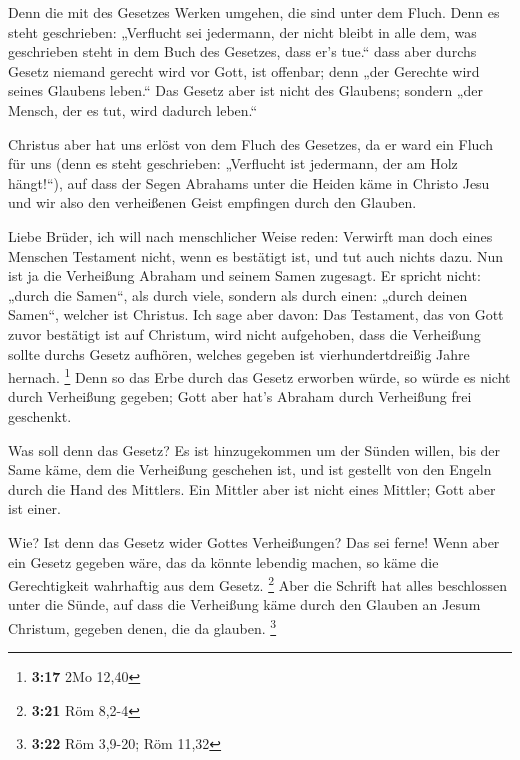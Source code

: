  Denn die mit des Gesetzes Werken umgehen, die sind unter
dem Fluch. Denn es steht geschrieben: „Verflucht sei jedermann, der
nicht bleibt in alle dem, was geschrieben steht in dem Buch des
Gesetzes, dass er's tue.``  dass aber durchs Gesetz
niemand gerecht wird vor Gott, ist offenbar; denn „der Gerechte wird
seines Glaubens leben.``  Das Gesetz aber ist nicht des
Glaubens; sondern „der Mensch, der es tut, wird dadurch leben.``

 Christus aber hat uns erlöst von dem Fluch des Gesetzes,
da er ward ein Fluch für uns (denn es steht geschrieben: „Verflucht ist
jedermann, der am Holz hängt!{}``),  auf dass der Segen
Abrahams unter die Heiden käme in Christo Jesu und wir also den
verheißenen Geist empfingen durch den Glauben.

 Liebe Brüder, ich will nach menschlicher Weise reden:
Verwirft man doch eines Menschen Testament nicht, wenn es bestätigt ist,
und tut auch nichts dazu.  Nun ist ja die Verheißung
Abraham und seinem Samen zugesagt. Er spricht nicht: „durch die Samen``,
als durch viele, sondern als durch einen: „durch deinen Samen``, welcher
ist Christus.  Ich sage aber davon: Das Testament, das
von Gott zuvor bestätigt ist auf Christum, wird nicht aufgehoben, dass
die Verheißung sollte durchs Gesetz aufhören, welches gegeben ist
vierhundertdreißig Jahre hernach. \footnote{\textbf{3:17} 2Mo 12,40}
 Denn so das Erbe durch das Gesetz erworben würde, so
würde es nicht durch Verheißung gegeben; Gott aber hat's Abraham durch
Verheißung frei geschenkt.

 Was soll denn das Gesetz? Es ist hinzugekommen um der
Sünden willen, bis der Same käme, dem die Verheißung geschehen ist, und
ist gestellt von den Engeln durch die Hand des Mittlers. 
Ein Mittler aber ist nicht eines Mittler; Gott aber ist einer.

 Wie? Ist denn das Gesetz wider Gottes Verheißungen? Das
sei ferne! Wenn aber ein Gesetz gegeben wäre, das da könnte lebendig
machen, so käme die Gerechtigkeit wahrhaftig aus dem Gesetz. \footnote{\textbf{3:21}
  Röm 8,2-4}  Aber die Schrift hat alles beschlossen
unter die Sünde, auf dass die Verheißung käme durch den Glauben an Jesum
Christum, gegeben denen, die da glauben. \footnote{\textbf{3:22} Röm
  3,9-20; Röm 11,32}

